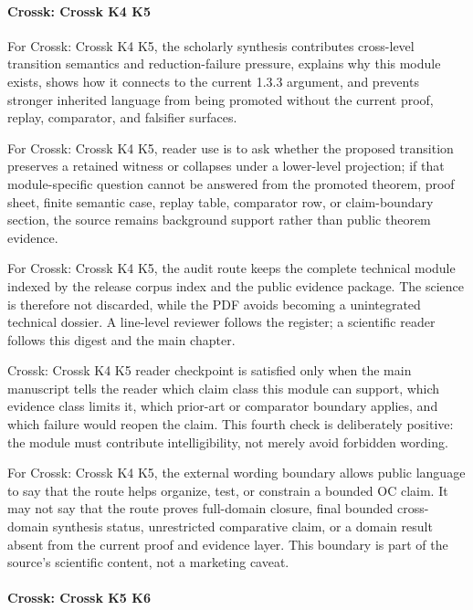 \paragraph{Crossk: Crossk K4 K5}

For Crossk: Crossk K4 K5, the scholarly synthesis contributes cross-level transition semantics and reduction-failure pressure, explains why this module exists, shows how it connects to the current 1.3.3 argument, and prevents stronger inherited language from being promoted without the current proof, replay, comparator, and falsifier surfaces.


For Crossk: Crossk K4 K5, reader use is to ask whether the proposed transition preserves a retained witness or collapses under a lower-level projection; if that module-specific question cannot be answered from the promoted theorem, proof sheet, finite semantic case, replay table, comparator row, or claim-boundary section, the source remains background support rather than public theorem evidence.


For Crossk: Crossk K4 K5, the audit route keeps the complete technical module indexed by the release corpus index and the public evidence package. The science is therefore not discarded, while the PDF avoids becoming a unintegrated technical dossier. A line-level reviewer follows the register; a scientific reader follows this digest and the main chapter.


Crossk: Crossk K4 K5 reader checkpoint is satisfied only when the main manuscript tells the reader which claim class this module can support, which evidence class limits it, which prior-art or comparator boundary applies, and which failure would reopen the claim. This fourth check is deliberately positive: the module must contribute intelligibility, not merely avoid forbidden wording.


For Crossk: Crossk K4 K5, the external wording boundary allows public language to say that the route helps organize, test, or constrain a bounded OC claim. It may not say that the route proves full-domain closure, final bounded cross-domain synthesis status, unrestricted comparative claim, or a domain result absent from the current proof and evidence layer. This boundary is part of the source's scientific content, not a marketing caveat.


\paragraph{Crossk: Crossk K5 K6}

